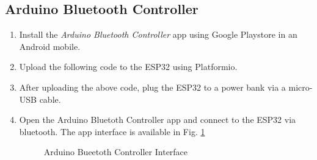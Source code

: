 \documentclass[conference]{IEEEtran}
\begin{document}
\subsection{Arduino Bluetooth Controller}
\begin{enumerate}

\item Install the {\em Arduino Bluetooth Controller} app using Google Playstore in an Android mobile.

\item Upload the following code to the ESP32 using Platformio.
\item After uploading the above code, plug the ESP32 to a power bank via a micro-USB cable.
\item Open the Arduino Bluetoth Controller app and connect to the ESP32 via bluetooth. The app interface is available in Fig. \ref{fig:ABC_home}
\begin{figure}[!h]
\centering
{}%
\caption{Arduino Bueetoth Controller Interface}
\label{fig:ABC_home}
\end{figure}


\end{enumerate}
\end{document}
